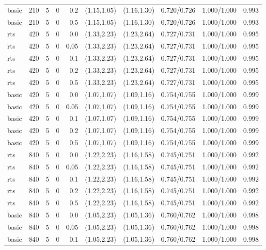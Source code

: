 \begin{tabular}{llrrrccccc}
basic & 210 & 5 & 0 & 0.2 & (1.15,1.05) & (1.16,1.30) & 0.720/0.726 & 1.000/1.000 & 0.993 \\
basic & 210 & 5 & 0 & 0.5 & (1.15,1.05) & (1.16,1.30) & 0.720/0.726 & 1.000/1.000 & 0.993 \\
rts & 420 & 5 & 0 & 0.0 & (1.33,2.23) & (1.23,2.64) & 0.727/0.731 & 1.000/1.000 & 0.995 \\
rts & 420 & 5 & 0 & 0.05 & (1.33,2.23) & (1.23,2.64) & 0.727/0.731 & 1.000/1.000 & 0.995 \\
rts & 420 & 5 & 0 & 0.1 & (1.33,2.23) & (1.23,2.64) & 0.727/0.731 & 1.000/1.000 & 0.995 \\
rts & 420 & 5 & 0 & 0.2 & (1.33,2.23) & (1.23,2.64) & 0.727/0.731 & 1.000/1.000 & 0.995 \\
rts & 420 & 5 & 0 & 0.5 & (1.33,2.23) & (1.23,2.64) & 0.727/0.731 & 1.000/1.000 & 0.995 \\
basic & 420 & 5 & 0 & 0.0 & (1.07,1.07) & (1.09,1.16) & 0.754/0.755 & 1.000/1.000 & 0.999 \\
basic & 420 & 5 & 0 & 0.05 & (1.07,1.07) & (1.09,1.16) & 0.754/0.755 & 1.000/1.000 & 0.999 \\
basic & 420 & 5 & 0 & 0.1 & (1.07,1.07) & (1.09,1.16) & 0.754/0.755 & 1.000/1.000 & 0.999 \\
basic & 420 & 5 & 0 & 0.2 & (1.07,1.07) & (1.09,1.16) & 0.754/0.755 & 1.000/1.000 & 0.999 \\
basic & 420 & 5 & 0 & 0.5 & (1.07,1.07) & (1.09,1.16) & 0.754/0.755 & 1.000/1.000 & 0.999 \\
rts & 840 & 5 & 0 & 0.0 & (1.22,2.23) & (1.16,1.58) & 0.745/0.751 & 1.000/1.000 & 0.992 \\
rts & 840 & 5 & 0 & 0.05 & (1.22,2.23) & (1.16,1.58) & 0.745/0.751 & 1.000/1.000 & 0.992 \\
rts & 840 & 5 & 0 & 0.1 & (1.22,2.23) & (1.16,1.58) & 0.745/0.751 & 1.000/1.000 & 0.992 \\
rts & 840 & 5 & 0 & 0.2 & (1.22,2.23) & (1.16,1.58) & 0.745/0.751 & 1.000/1.000 & 0.992 \\
rts & 840 & 5 & 0 & 0.5 & (1.22,2.23) & (1.16,1.58) & 0.745/0.751 & 1.000/1.000 & 0.992 \\
basic & 840 & 5 & 0 & 0.0 & (1.05,2.23) & (1.05,1.36) & 0.760/0.762 & 1.000/1.000 & 0.998 \\
basic & 840 & 5 & 0 & 0.05 & (1.05,2.23) & (1.05,1.36) & 0.760/0.762 & 1.000/1.000 & 0.998 \\
basic & 840 & 5 & 0 & 0.1 & (1.05,2.23) & (1.05,1.36) & 0.760/0.762 & 1.000/1.000 & 0.998 \\

\end{tabular}
